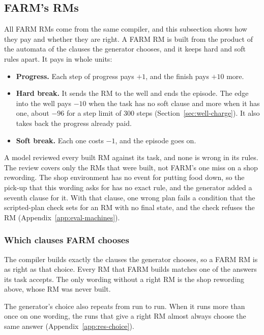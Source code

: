 \documentclass[11pt,english,listoffigures,listoftables]{tfgetsinf}
\newcommand{\gain}[1]{\textcolor{green!40!black}{\bfseries\boldmath #1}}  %
\newcommand{\loss}[1]{\textcolor{red!60!black}{\bfseries\boldmath #1}}  %
\begin{document}
\subsection{FARM's RMs}
\label{sec:res-farm-machines}

All FARM RMs come from the same compiler, and this subsection shows how they pay and whether they are right. A FARM RM is built from the product of the automata of the clauses the generator chooses, and it keeps hard and soft rules apart. It pays in whole units:
\begin{itemize}
    \item \textbf{Progress.} Each step of progress pays \gain{$+1$}, and the finish pays \gain{$+10$} more.
    \item \textbf{Hard break.} It sends the RM to the well and ends the episode. The edge into the well pays \loss{$-10$} when the task has no soft clause and more when it has one, about \loss{$-96$} for a step limit of 300 steps (Section~\ref{sec:well-charge}). It also takes back the progress already paid.
    \item \textbf{Soft break.} Each one costs \loss{$-1$}, and the episode goes on.
\end{itemize}

A model reviewed every built RM against its task, and none is wrong in its rules.
The review covers only the RMs that were built, not FARM's one miss on a shop rewording. The shop environment has no event for putting food down, so the pick-up that this wording asks for has no exact rule, and the generator added a seventh clause for it. With that clause, one wrong plan fails a condition that the scripted-plan check sets for an RM with no final state, and the check refuses the RM (Appendix~\ref{app:eval-machines}).

\subsubsection{Which clauses FARM chooses}
\label{sec:res-clauses}

The compiler builds exactly the clauses the generator chooses, so a FARM RM is as right as that choice. Every RM that FARM builds matches one of the answers its task accepts. The only wording without a right RM is the shop rewording above, whose RM was never built.

The generator's choice also repeats from run to run. When it runs more than once on one wording, the runs that give a right RM almost always choose the same answer (Appendix~\ref{app:res-choice}).
\end{document}
